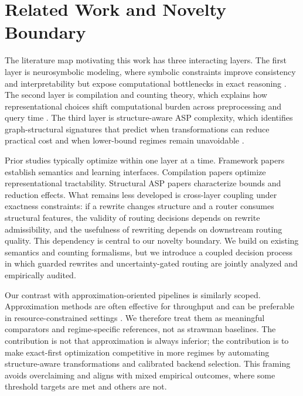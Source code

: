 \documentclass{article} %
\begin{document}
\section{Related Work and Novelty Boundary}
\label{sec:related}
The literature map motivating this work has three interacting layers. The first layer is neurosymbolic modeling, where symbolic constraints improve consistency and interpretability but expose computational bottlenecks in exact reasoning \citep{src_010,src_011,src_012,src_014,src_016,src_019,src_033,src_040}. The second layer is compilation and counting theory, which explains how representational choices shift computational burden across preprocessing and query time \citep{src_002,src_003,src_004,src_006,src_007,src_008,src_009,src_022,src_039}. The third layer is structure-aware ASP complexity, which identifies graph-structural signatures that predict when transformations can reduce practical cost and when lower-bound regimes remain unavoidable \citep{src_001,src_045,src_046,src_047,src_048}.

Prior studies typically optimize within one layer at a time. Framework papers establish semantics and learning interfaces. Compilation papers optimize representational tractability. Structural ASP papers characterize bounds and reduction effects. What remains less developed is cross-layer coupling under exactness constraints: if a rewrite changes structure and a router consumes structural features, the validity of routing decisions depends on rewrite admissibility, and the usefulness of rewriting depends on downstream routing quality. This dependency is central to our novelty boundary. We build on existing semantics and counting formalisms, but we introduce a coupled decision process in which guarded rewrites and uncertainty-gated routing are jointly analyzed and empirically audited.

Our contrast with approximation-oriented pipelines is similarly scoped. Approximation methods are often effective for throughput and can be preferable in resource-constrained settings \citep{src_013,src_015,src_033}. We therefore treat them as meaningful comparators and regime-specific references, not as strawman baselines. The contribution is not that approximation is always inferior; the contribution is to make exact-first optimization competitive in more regimes by automating structure-aware transformations and calibrated backend selection. This framing avoids overclaiming and aligns with mixed empirical outcomes, where some threshold targets are met and others are not.
\end{document}
